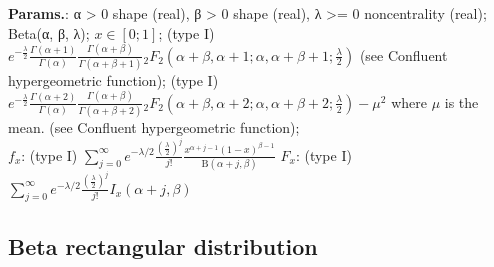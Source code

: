     {\color{darkblue} \textbf{Params.}:} {α > 0 shape (real), β > 0 shape (real), λ >= 0 noncentrality (real)}; {Beta(α, β, λ)}; {$x \in [0; 1]\!$}; {(type I) $e^{-\frac{\lambda}{2}}\frac{\Gamma\left(\alpha + 1\right)}{\Gamma\left(\alpha\right)} \frac{\Gamma\left(\alpha+\beta\right)}{\Gamma\left(\alpha + \beta + 1\right)} {}_2F_2\left(\alpha+\beta,\alpha+1;\alpha,\alpha+\beta+1;\frac{\lambda}{2}\right)$ (see Confluent hypergeometric function)}; {(type I) $e^{-\frac{\lambda}{2}}\frac{\Gamma\left(\alpha + 2\right)}{\Gamma\left(\alpha\right)} \frac{\Gamma\left(\alpha+\beta\right)}{\Gamma\left(\alpha + \beta + 2\right)} {}_2F_2\left(\alpha+\beta,\alpha+2;\alpha,\alpha+\beta+2;\frac{\lambda}{2}\right) - \mu^2$ where $\mu$ is the mean. (see Confluent hypergeometric function)};\hspace{0.5cm}\\{\color{darkblue} \textbf{$f_x$}:} {(type I) $\sum_{j = 0}^{\infty} e^{-\lambda/2} \frac{\left(\frac{\lambda}{2}\right)^j}{j!}\frac{x^{\alpha + j - 1}\left(1-x\right)^{\beta - 1}}{\mathrm{B}\left(\alpha + j,\beta\right)}$}{\color{darkblue} \textbf{$F_x$}:} {(type I) $\sum_{j = 0}^{\infty} e^{-\lambda/2} \frac{\left(\frac{\lambda}{2}\right)^j}{j!} I_x \left(\alpha + j,\beta\right)$}



    
        
\subsection{Beta rectangular distribution}





